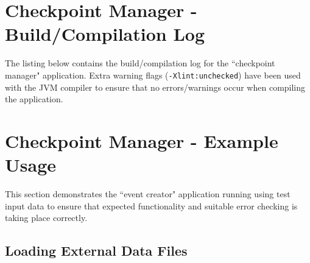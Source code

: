 \documentclass[a4paper, 12pt]{article}
\begin{document}
\clearpage
\section{Checkpoint Manager - Build/Compilation Log}

The listing below contains the build/compilation log for the ``checkpoint manager" application. Extra warning flags (\verb+-Xlint:unchecked+) have been used with the JVM compiler to ensure that no errors/warnings occur when compiling the application. \\



\clearpage
\section{Checkpoint Manager - Example Usage}
This section demonstrates the ``event creator" application running using test input data to ensure that expected functionality and suitable error checking is taking place correctly.\\

\subsection{Loading External Data Files}

\end{document}
